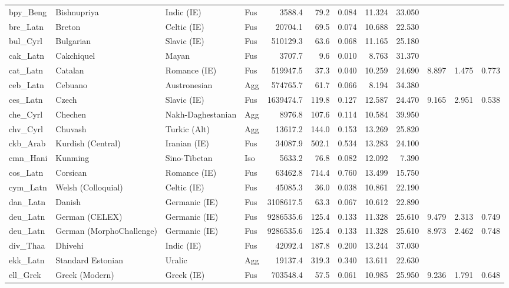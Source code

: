 \begin{tabular}{ll l l rr rr r rr r}
bpy\_Beng & Bishnupriya & Indic (IE) & Fus & 3588.4 & 79.2 & 0.084 & 11.324 & 33.050 &  &  &  \\
bre\_Latn & Breton & Celtic (IE) & Fus & 20704.1 & 69.5 & 0.074 & 10.688 & 22.530 &  &  &  \\
bul\_Cyrl & Bulgarian & Slavic (IE) & Fus & 510129.3 & 63.6 & 0.068 & 11.165 & 25.180 &  &  &  \\
cak\_Latn & Cakchiquel & Mayan & Fus & 3707.7 & 9.6 & 0.010 & 8.763 & 31.370 &  &  &  \\
cat\_Latn & Catalan & Romance (IE) & Fus & 519947.5 & 37.3 & 0.040 & 10.259 & 24.690 & 8.897 & 1.475 & 0.773 \\
ceb\_Latn & Cebuano & Austronesian & Agg & 574765.7 & 61.7 & 0.066 & 8.194 & 34.380 &  &  &  \\
ces\_Latn & Czech & Slavic (IE) & Fus & 1639474.7 & 119.8 & 0.127 & 12.587 & 24.470 & 9.165 & 2.951 & 0.538 \\
che\_Cyrl & Chechen & Nakh-Daghestanian & Agg & 8976.8 & 107.6 & 0.114 & 10.584 & 39.950 &  &  &  \\
chv\_Cyrl & Chuvash & Turkic (Alt) & Agg & 13617.2 & 144.0 & 0.153 & 13.269 & 25.820 &  &  &  \\
ckb\_Arab & Kurdish (Central) & Iranian (IE) & Fus & 34087.9 & 502.1 & 0.534 & 13.283 & 24.100 &  &  &  \\
cmn\_Hani & Kunming & Sino-Tibetan & Iso & 5633.2 & 76.8 & 0.082 & 12.092 & 7.390 &  &  &  \\
cos\_Latn & Corsican & Romance (IE) & Fus & 63462.8 & 714.4 & 0.760 & 13.499 & 15.750 &  &  &  \\
cym\_Latn & Welsh (Colloquial) & Celtic (IE) & Fus & 45085.3 & 36.0 & 0.038 & 10.861 & 22.190 &  &  &  \\
dan\_Latn & Danish & Germanic (IE) & Fus & 3108617.5 & 63.3 & 0.067 & 10.612 & 22.890 &  &  &  \\
deu\_Latn & German (CELEX) & Germanic (IE) & Fus & 9286535.6 & 125.4 & 0.133 & 11.328 & 25.610 & 9.479 & 2.313 & 0.749 \\
deu\_Latn & German (MorphoChallenge) & Germanic (IE) & Fus & 9286535.6 & 125.4 & 0.133 & 11.328 & 25.610 & 8.973 & 2.462 & 0.748 \\
div\_Thaa & Dhivehi & Indic (IE) & Fus & 42092.4 & 187.8 & 0.200 & 13.244 & 37.030 &  &  &  \\
ekk\_Latn & Standard Estonian & Uralic & Agg & 19137.4 & 319.3 & 0.340 & 13.611 & 22.630 &  &  &  \\
ell\_Grek & Greek (Modern) & Greek (IE) & Fus & 703548.4 & 57.5 & 0.061 & 10.985 & 25.950 & 9.236 & 1.791 & 0.648 \\

\end{tabular}

